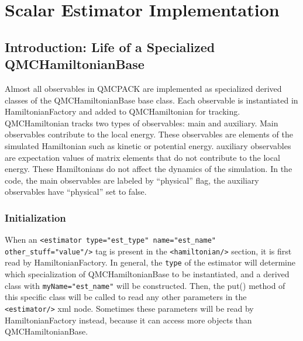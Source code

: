 \section{Scalar Estimator Implementation}
\subsection{Introduction: Life of a Specialized QMCHamiltonianBase}

Almost all observables in QMCPACK are implemented as specialized derived classes of the QMCHamiltonianBase base class. Each observable is instantiated in HamiltonianFactory and added to QMCHamiltonian for tracking. QMCHamiltonian tracks two types of observables: main and auxiliary. Main observables contribute to the local energy. These observables are elements of the simulated Hamiltonian such as kinetic or potential energy. auxiliary observables are expectation values of matrix elements that do not contribute to the local energy. These Hamiltonians do not affect the dynamics of the simulation. In the code, the main observables are labeled by ``physical'' flag, the auxiliary observables have ``physical'' set to false.

\subsubsection{Initialization}
When an \verb|<estimator type="est_type" name="est_name" other_stuff="value"/>| tag is present in the \verb|<hamiltonian/>| section, it is first read by HamiltonianFactory. In general, the \verb|type| of the estimator will determine which specialization of QMCHamiltonianBase to be instantiated, and a derived class with \verb|myName="est_name"| will be constructed. Then, the put() method of this specific class will be called to read any other parameters in the \verb|<estimator/>| xml node. Sometimes these parameters will be read by HamiltonianFactory instead, because it can access more objects than QMCHamiltonianBase.

